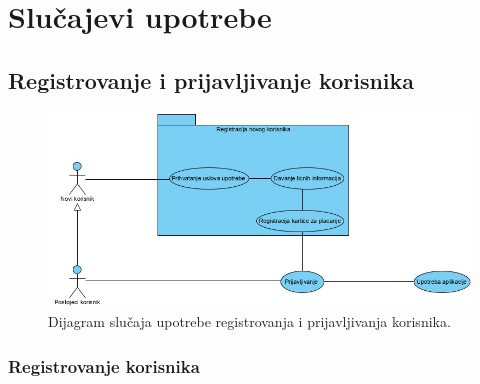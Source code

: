 \section{\bfseries Slučajevi upotrebe}

\subsection{\bfseries Registrovanje i prijavljivanje korisnika}
\begin{figure}[H]
\begin{center}
\includegraphics[width=\textwidth]{Slike/UseCaseZaRegLog.jpg}
\end{center}
    \caption{Dijagram slučaja upotrebe registrovanja i prijavljivanja korisnika.}
\label{fig:RegistracijaPrijavljivanje}
\end{figure}


\subsubsection{\bfseries Registrovanje korisnika}

